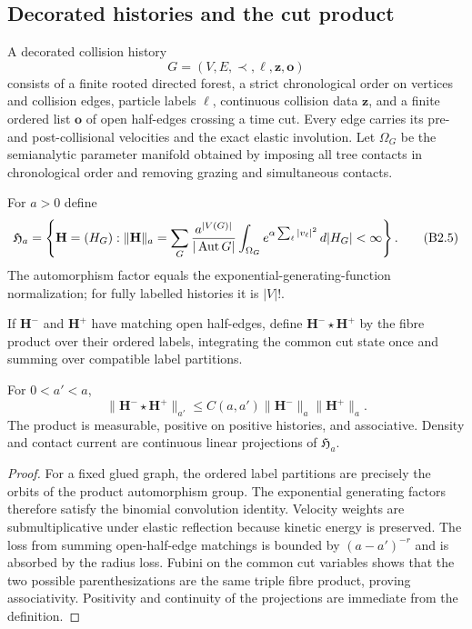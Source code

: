 \subsection{Decorated histories and the cut product}

A decorated collision history
\[
 G=(V,E,\prec,\ell,\mathbf z,\mathbf o)
\]
consists of a finite rooted directed forest, a strict chronological order on
vertices and collision edges, particle labels $\ell$, continuous collision
data $\mathbf z$, and a finite ordered list $\mathbf o$ of open half-edges
crossing a time cut.  Every edge carries its pre- and post-collisional
velocities and the exact elastic involution.  Let $\Omega_G$ be the
semianalytic parameter manifold obtained by imposing all tree contacts in
chronological order and removing grazing and simultaneous contacts.

For $a>0$ define
\[
 \mathfrak H_a
 =\left\{\mathbf H=(H_G):
 \|\mathbf H\|_a
 =\sum_G {a^{|V(G)|}\over|\operatorname{Aut}G|}
 \int_{\Omega_G}e^{\alpha\sum_{\ell}|v_\ell|^2}\,d|H_G|<\infty\right\}.
                                                                    \tag{B2.5}
\]
The automorphism factor equals the exponential-generating-function
normalization; for fully labelled histories it is $|V|!$.

If $\mathbf H^-$ and $\mathbf H^+$ have matching open half-edges, define
$\mathbf H^-\star\mathbf H^+$ by the fibre product over their ordered labels,
integrating the common cut state once and summing over compatible label
partitions.

\begin{proposition}
\label{prop:r27-b2-algebra}
For $0<a'<a$,
\[
 \|\mathbf H^-\star\mathbf H^+\|_{a'}
 \le C(a,a')\|\mathbf H^-\|_a\|\mathbf H^+\|_a.            \tag{B2.6}
\]
The product is measurable, positive on positive histories, and associative.
Density and contact current are continuous linear projections of
$\mathfrak H_a$.
\end{proposition}

\begin{proof}
For a fixed glued graph, the ordered label partitions are precisely the
orbits of the product automorphism group.  The exponential generating factors
therefore satisfy the binomial convolution identity.  Velocity weights are
submultiplicative under elastic reflection because kinetic energy is
preserved.  The loss from summing open-half-edge matchings is bounded by
$(a-a')^{-r}$ and is absorbed by the radius loss.  Fubini on the common cut
variables shows that the two possible parenthesizations are the same triple
fibre product, proving associativity.  Positivity and continuity of the
projections are immediate from the definition.
\end{proof}

